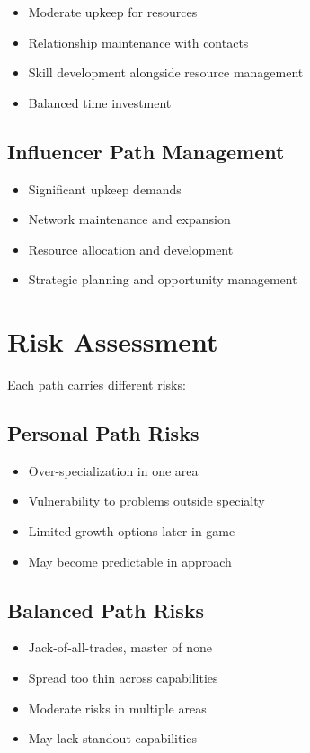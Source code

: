 \documentclass[11pt,twoside,openany]{book}
\begin{document}
\begin{itemize}
\item Moderate upkeep for resources
\item Relationship maintenance with contacts
\item Skill development alongside resource management
\item Balanced time investment
\end{itemize}

\subsection*{Influencer Path Management}

\begin{itemize}
\item Significant upkeep demands
\item Network maintenance and expansion
\item Resource allocation and development
\item Strategic planning and opportunity management
\end{itemize}

\section*{Risk Assessment} 

Each path carries different risks:

\subsection*{Personal Path Risks}

\begin{itemize}
\item Over-specialization in one area
\item Vulnerability to problems outside specialty
\item Limited growth options later in game
\item May become predictable in approach
\end{itemize}

\subsection*{Balanced Path Risks}

\begin{itemize}
\item Jack-of-all-trades, master of none
\item Spread too thin across capabilities
\item Moderate risks in multiple areas
\item May lack standout capabilities
\end{itemize}
\end{document}
